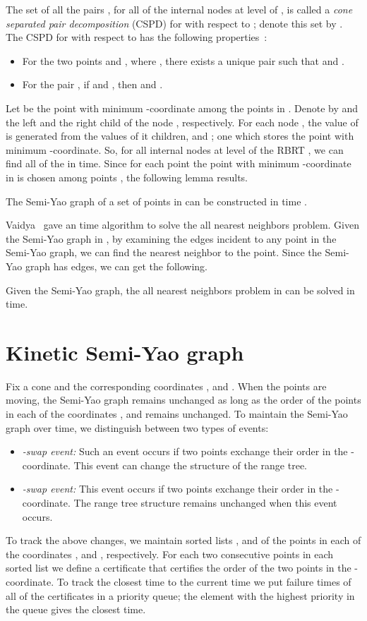 \documentclass[11pt]{llncs}
\begin{document}
The set of all the pairs , for all of the internal nodes  at level  of , is called a \textit{cone separated pair decomposition} (CSPD) for  with respect to ; denote this set by . The CSPD  for  with respect to  has the following properties~\cite{Abam:2011:KSX:1971362.1971367}:
\begin{itemize}
\item For the two points  and , where , there exists a unique pair  such that  and .
\item For the pair , if  and , then  and .
\end{itemize}
Let  be the point with minimum -coordinate among the points in . Denote by  and  the left and the right child of the node , respectively.  For each node , the value of  is generated from the values of it children,  and ; one which stores the point with minimum -coordinate. So, for all internal nodes  at level  of the RBRT , we can find all of the  in  time. Since for each point  the point with minimum -coordinate in  is chosen among  points , the following lemma results.
\begin{lemma}\label{the:SYConstructionTime}
The Semi-Yao graph of a set of  points in  can be constructed in time .
\end{lemma}
Vaidya~\cite{Vaidya:1989:ONL:70530.70532} gave an  time algorithm to solve the all nearest neighbors problem. Given the Semi-Yao graph in , by examining the edges incident to any point in the Semi-Yao graph, we can find the nearest neighbor to the point. Since the Semi-Yao graph has  edges, we can get the following.
\begin{lemma}\label{the:ANNConstructionTime}
Given the Semi-Yao graph, the all nearest neighbors problem in  can be solved in  time.
\end{lemma}
\section{Kinetic Semi-Yao graph}\label{sec:KineticSY}
Fix a cone  and the corresponding coordinates , and . When the points are moving, the Semi-Yao graph remains unchanged as long as the order of the points in each of the coordinates , and  remains unchanged. To maintain the Semi-Yao graph over time, we distinguish between two types of events:
\begin{itemize}
\item \textit{-swap event:} Such an event occurs if two points exchange their order in the -coordinate. This event can change the structure of the range tree.
\item \textit{-swap event:} This event occurs if two points exchange their order in the -coordinate. The range tree structure remains unchanged when this event occurs.
\end{itemize}
To track the above changes, we maintain sorted lists , and  of the points in each of the coordinates , and , respectively. For each two consecutive points in each sorted list  we define a certificate that certifies the order of the two points in the -coordinate. To track the closest time to the current time we put failure times of all of the certificates in a priority queue; the element with the highest priority in the queue gives the closest time.
\end{document}
